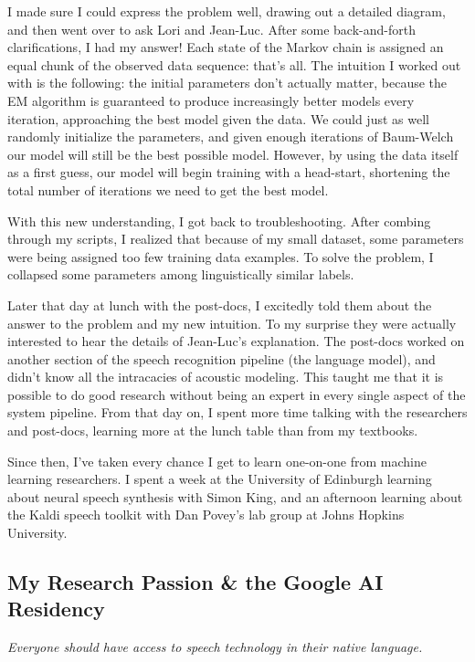 \documentclass[12pt,a4paper]{article}
\begin{document}
I made sure I could express the problem well, drawing out a detailed diagram, and then went over to ask Lori and Jean-Luc. After some back-and-forth clarifications, I had my answer! Each state of the Markov chain is assigned an equal chunk of the observed data sequence: that's all. The intuition I worked out with is the following: the initial parameters don't actually matter, because the EM algorithm is guaranteed to produce increasingly better models every iteration, approaching the best model given the data. We could just as well randomly initialize the parameters, and given enough iterations of Baum-Welch our model will still be the best possible model. However, by using the data itself as a first guess, our model will begin training with a head-start, shortening the total number of iterations we need to get the best model. 

With this new understanding, I got back to troubleshooting. After combing through my scripts, I realized that because of my small dataset, some parameters were being assigned too few training data examples. To solve the problem, I collapsed some parameters among linguistically similar labels.

Later that day at lunch with the post-docs, I excitedly told them about the answer to the problem and my new intuition. To my surprise they were actually interested to hear the details of Jean-Luc's explanation. The post-docs worked on another section of the speech recognition pipeline (the language model), and didn't know all the intracacies of acoustic modeling. This taught me that it is possible to do good research without being an expert in every single aspect of the system pipeline. From that day on, I spent more time talking with the researchers and post-docs, learning more at the lunch table than from my textbooks.

Since then, I've taken every chance I get to learn one-on-one from machine learning researchers. I spent a week at the University of Edinburgh learning about neural speech synthesis with Simon King, and an afternoon learning about the Kaldi speech toolkit with Dan Povey's lab group at Johns Hopkins University.


\subsection*{My Research Passion \& the Google AI Residency}

\begin{center}
\textit{Everyone should have access to speech technology in their native language.}
\end{center}
\end{document}
